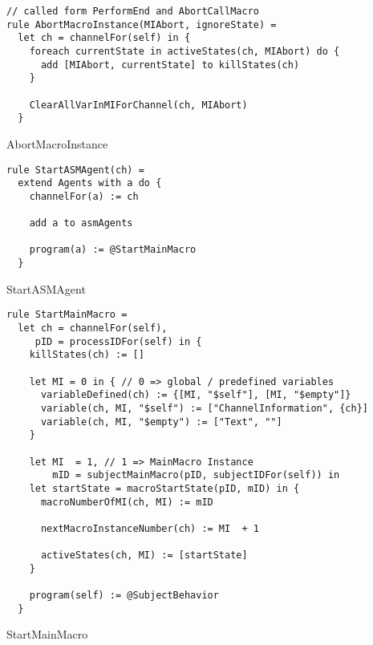 \begin{listing}[H]
\begin{verbatim}
// called form PerformEnd and AbortCallMacro
rule AbortMacroInstance(MIAbort, ignoreState) =
  let ch = channelFor(self) in {
    foreach currentState in activeStates(ch, MIAbort) do {
      add [MIAbort, currentState] to killStates(ch)
    }

    ClearAllVarInMIForChannel(ch, MIAbort)
  }
\end{verbatim}
\caption{AbortMacroInstance}
\label{lst:asm:AbortMacroInstance}
\end{listing}




\begin{listing}[H]
\begin{verbatim}
rule StartASMAgent(ch) =
  extend Agents with a do {
    channelFor(a) := ch

    add a to asmAgents

    program(a) := @StartMainMacro
  }
\end{verbatim}
\caption{StartASMAgent}
\label{lst:asm:StartASMAgent}
\end{listing}


\begin{listing}[H]
\begin{verbatim}
rule StartMainMacro =
  let ch = channelFor(self),
     pID = processIDFor(self) in {
    killStates(ch) := []

    let MI = 0 in { // 0 => global / predefined variables
      variableDefined(ch) := {[MI, "$self"], [MI, "$empty"]}
      variable(ch, MI, "$self") := ["ChannelInformation", {ch}]
      variable(ch, MI, "$empty") := ["Text", ""]
    }

    let MI  = 1, // 1 => MainMacro Instance
        mID = subjectMainMacro(pID, subjectIDFor(self)) in
    let startState = macroStartState(pID, mID) in {
      macroNumberOfMI(ch, MI) := mID

      nextMacroInstanceNumber(ch) := MI  + 1

      activeStates(ch, MI) := [startState]
    }

    program(self) := @SubjectBehavior
  }
\end{verbatim}
\caption{StartMainMacro}
\label{lst:asm:StartMainMacro}
\end{listing}




